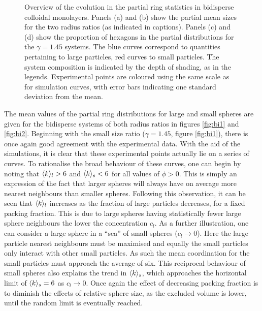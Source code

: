 \begin{figure}[bt]
     \caption{Overview of the evolution in the partial ring statistics in bidisperse colloidal monolayers. Panels (a) and (b) show the partial mean sizes for the two radius ratios (as indicated in captions). Panels (c) and (d) show the proportion of hexagons in the partial distributions for the $\gamma=1.45$ systems. The blue curves correspond to quantities pertaining to large particles, red curves to small particles. The system composition is indicated by the depth of shading, as in the legends. Experimental points are coloured using the same scale as for simulation curves, with error bars indicating one standard deviation from the mean.}
     \label{fig:bi}
\end{figure}

The mean values of the partial ring distributions for large and small spheres are given for the bidisperse systems of both radius ratios in figures \ref{fig:bi1} and \ref{fig:bi2}.
Beginning with the small size ratio ($\gamma=1.45$, figure \ref{fig:bi1}), there is once again good agreement with the experimental data.
With the aid of the \mc{} simulations, it is clear that these experimental points actually lie on a series of curves.
To rationalise the broad behaviour of these curves, one can begin by noting that $\langle k \rangle_l>6$ and $\langle k \rangle_s<6$ for all values of $\phi>0$.
This is simply an expression of the fact that larger spheres will always have on average more nearest neighbours than smaller spheres.
Following this observation, it can be seen that $\langle k \rangle_l$ increases as the fraction of large particles decreases, for a fixed packing fraction.
This is due to large spheres having statistically fewer large sphere neighbours the lower the concentration $c_l$.
As a further illustration, one can consider a large sphere in a ``sea'' of small spheres ($c_l\rightarrow 0$).
Here the large particle nearest neighbours must be maximised and equally the small particles only interact with other small particles.
As such the mean coordination for the small particles must approach the average of six.
This reciprocal behaviour of small spheres also explains the trend in $\langle k \rangle_s$, which approaches the horizontal limit of $\langle k \rangle_s=6$ as $c_l\rightarrow 0$.
Once again the effect of decreasing packing fraction is to diminish the effects of relative sphere size, as the excluded volume is lower, until the random limit is eventually reached.

